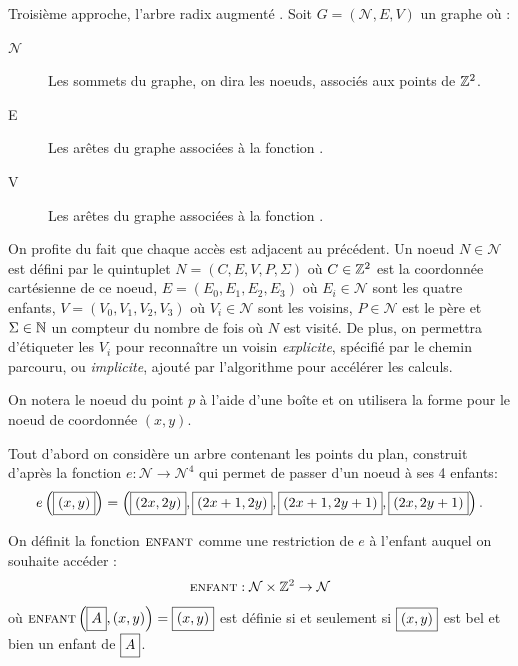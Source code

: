\newcommand{\voisin}{\text{\scshape voisin}\xspace}
\newcommand{\enfant}{\text{\scshape enfant}\xspace}
\newcommand{\pere}{\text{\scshape pere}\xspace}
\newcommand{\parcours}{\text{\scshape parcours}\xspace}
\newcommand{\HULL}{\text{\scshape hull}\xspace}

\newcommand{\Nodes}{\mathcal{N}}
\newcommand{\Node}[1]{\fbox{\vphantom{(}#1}}


Troisième approche, l'arbre radix augmenté \cite{BKP}. Soit $G=(\Nodes,E,V)$ un graphe où :
\begin{description}
\item[$\Nodes$] Les sommets du graphe, on dira les noeuds, associés aux points de $\mathbb{Z}^2$.
\item[E] Les arêtes du graphe associées à la fonction \enfant.
\item[V] Les arêtes du graphe associées à la fonction \voisin.
\end{description}
On profite du fait que chaque accès est adjacent au précédent. Un noeud $N\in \mathcal{N}$ est défini par le quintuplet $N=(C, E, V, P, \Sigma)$ où $C\in \mathbb{Z}^2$ est la coordonnée cartésienne de ce noeud, $E=(E_0, E_1, E_2, E_3)$ où $E_i\in \mathcal{N}$ sont les quatre enfants, $V=(V_0,V_1,V_2,V_3)$ où $V_i\in{\mathcal{N}}$ sont les voisins, $P\in{\mathcal{N}}$ est le père et $\Sigma\in{\mathbb{N}}$ un compteur du nombre de fois où $N$ est visité. De plus, on permettra d'étiqueter les $V_i$ pour reconnaître un voisin \emph{explicite}, spécifié par le chemin parcouru, ou \emph{implicite}, ajouté par l'algorithme pour accélérer les calculs.

On notera le noeud du point $p$ à l'aide d'une boîte \Node{$p$} et on utilisera la forme \Node{$(x,y)$} pour le noeud de coordonnée $(x,y)$. 

Tout d'abord on considère un arbre contenant les points du plan, construit d'après la fonction $e:\Nodes \rightarrow \Nodes^4$ qui permet de passer d'un noeud à ses 4 enfants:
\begin{equation}
e\left(\Node{$(x,y)$}\right) = \left ( \Node{$(2x,2y)$},\Node{$(2x+1,2y)$},\Node{$(2x+1,2y+1)$},\Node{$(2x,2y+1)$}\right )\text{.}
\end{equation}

On définit la fonction $\text{\scshape enfant}$ comme une restriction de $e$ à l'enfant auquel on souhaite accéder : $$\text{\scshape enfant} : \Nodes \times \Z^2 \rightarrow \Nodes $$ où $\text{\scshape enfant}\left(\Node{$A$}, (x,y)\right) = \Node{$(x,y)$}$ est définie si et seulement si $\Node{$(x,y)$}$ est bel et bien un enfant de $\Node{$A$}$.

